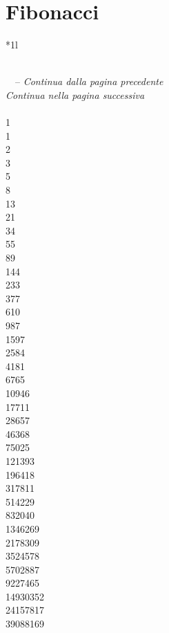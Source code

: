 \chapter{Fibonacci}
\begin{longtable}{*{1}{l}}\toprule
\caption{Numeri di Fibonacci}\\
\midrule
\endfirsthead
{} {\tablename\ \thetable\ -- \textit{Continua dalla pagina precedente}} \\
\toprule
\endhead
\bottomrule
{} {\textit{Continua nella pagina successiva}} \\
\endfoot
{}\\
1\\
1\\
2\\
3\\
5\\
8\\
13\\
21\\
34\\
55\\
89\\
144\\
233\\
377\\
610\\
987\\
1597\\
2584\\
4181\\
6765\\
10946\\
17711\\
28657\\
46368\\
75025\\
121393\\
196418\\
317811\\
514229\\
832040\\
1346269\\
2178309\\
3524578\\
5702887\\
9227465\\
14930352\\
24157817\\
39088169\\

\end{longtable}
